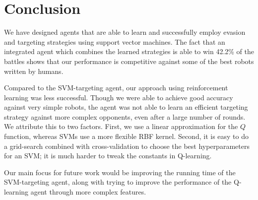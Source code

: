 \documentclass{article}
\theoremstyle{plain}
\theoremstyle{definition}
\theoremstyle{remark}
\begin{document}
\section{Conclusion}
We have designed agents that are able to learn and successfully employ evasion and targeting strategies using support vector machines. The fact that an integrated agent which combines the learned strategies is able to win 42.2\% of the battles shows that our performance is competitive against some of the best robots written by humans. 

Compared to the SVM-targeting agent, our approach using reinforcement learning was less successful. Though we were able to achieve good accuracy against very simple robots, the agent was not able to learn an efficient targeting strategy against more complex opponents, even after a large number of rounds. We attribute this to two factors. First, we use a linear approximation for the $Q$ function, whereas SVMs use a more flexible RBF kernel. Second, it is easy to do a grid-search
combined with cross-validation to choose the best hyperparameters for an SVM; it is much harder to tweak the constants in Q-learning. 

Our main focus for future work would be improving the running time of the SVM-targeting agent, along with trying to improve the performance of the Q-learning agent through more complex features.



\end{document}
